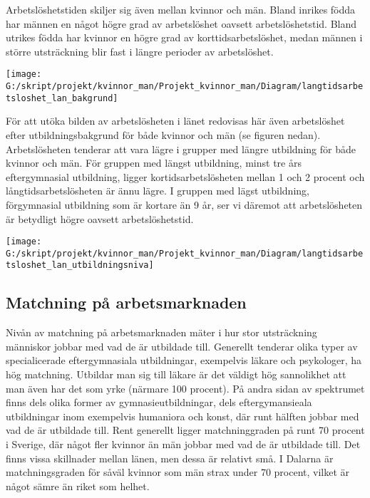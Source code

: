 \documentclass[
]{article}
\begin{document}
Arbetslöshetstiden skiljer sig även mellan kvinnor och män. Bland
inrikes födda har männen en något högre grad av arbetslöshet oavsett
arbetslöshetstid. Bland utrikes födda har kvinnor en högre grad av
korttidsarbetslöshet, medan männen i större utsträckning blir fast i
längre perioder av arbetslöshet.

\begin{center}\texttt{[image: G:/skript/projekt/kvinnor\_man/Projekt\_kvinnor\_man/Diagram/langtidsarbetsloshet\_lan\_bakgrund]} \end{center}

För att utöka bilden av arbetslösheten i länet redovisas här även
arbetslöshet efter utbildningsbakgrund för både kvinnor och män (se
figuren nedan). Arbetslösheten tenderar att vara lägre i grupper med
längre utbildning för både kvinnor och män. För gruppen med längst
utbildning, minst tre års eftergymnasial utbildning, ligger
kortidsarbetslösheten mellan 1 och 2 procent och långtidsarbetslösheten
är ännu lägre. I gruppen med lägst utbildning, förgymnasial utbildning
som är kortare än 9 år, ser vi däremot att arbetslösheten är betydligt
högre oavsett arbetslöshetstid.

\begin{center}\texttt{[image: G:/skript/projekt/kvinnor\_man/Projekt\_kvinnor\_man/Diagram/langtidsarbetsloshet\_lan\_utbildningsniva]} \end{center}

\hypertarget{matchning-puxe5-arbetsmarknaden}{%
\subsection{Matchning på
arbetsmarknaden}\label{matchning-puxe5-arbetsmarknaden}}

Nivån av matchning på arbetsmarknaden mäter i hur stor utsträckning
människor jobbar med vad de är utbildade till. Generellt tenderar olika
typer av specialicerade eftergymnasiala utbildningar, exempelvis läkare
och psykologer, ha hög matchning. Utbildar man sig till läkare är det
väldigt hög sannolikhet att man även har det som yrke (närmare 100
procent). På andra sidan av spektrumet finns dels olika former av
gymnasieutbildningar, dels eftergymansieala utbildningar inom exempelvis
humaniora och konst, där runt hälften jobbar med vad de är utbildade
till. Rent generellt ligger matchninggraden på runt 70 procent i
Sverige, där något fler kvinnor än män jobbar med vad de är utbildade
till. Det finns vissa skillnader mellan länen, men dessa är relativt
små. I Dalarna är matchningsgraden för såväl kvinnor som män strax under
70 procent, vilket är något sämre än riket som helhet.
\end{document}
